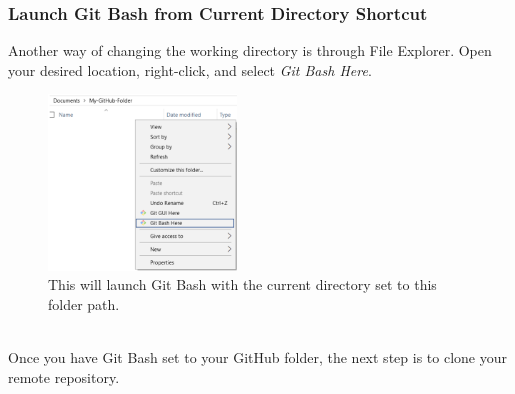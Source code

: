 \documentclass[12pt]{article}
\begin{document}
    \subsubsection{Launch Git Bash from Current Directory Shortcut}
    Another way of changing the working directory is through File Explorer. Open your desired location, right-click, and select \emph{Git Bash Here}.
    \begin{figure}[h!]
        \includegraphics[width=5cm, center]{Bash-Here-Shortcut}
        \caption{This will launch Git Bash with the current directory set to this folder path.}
    \end{figure} \\
    Once you have Git Bash set to your GitHub folder, the next step is to clone your remote repository. 
\end{document}
